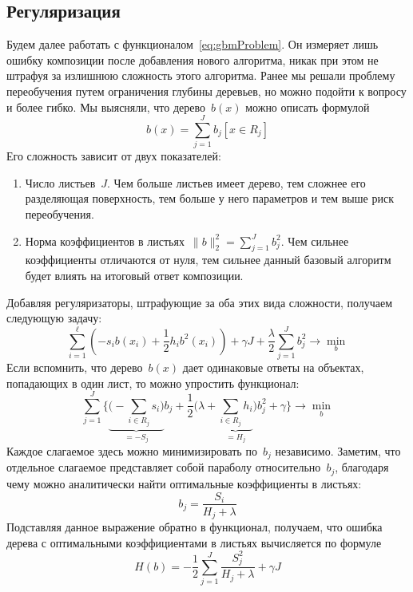 \documentclass[12pt,fleqn]{article}
\begin{document}
\subsection{Регуляризация}
Будем далее работать с функционалом~\eqref{eq:gbmProblem}.
Он измеряет лишь ошибку композиции после добавления нового алгоритма,
никак при этом не штрафуя за излишнюю сложность этого алгоритма.
Ранее мы решали проблему переобучения путем ограничения глубины деревьев,
но можно подойти к вопросу и более гибко.
Мы выясняли, что дерево~$b(x)$ можно описать формулой
\[
    b(x)
    =
    \sum_{j = 1}^{J}
        b_{j}
        [x \in R_{j}]
\]
Его сложность зависит от двух показателей:
\begin{enumerate}
    \item Число листьев~$J$. Чем больше листьев имеет дерево, тем сложнее его разделяющая поверхность,
        тем больше у него параметров и тем выше риск переобучения.
    \item Норма коэффициентов в листьях~$\|b\|_2^2 = \sum_{j = 1}^{J} b_j^2$.
        Чем сильнее коэффициенты отличаются от нуля, тем сильнее данный
        базовый алгоритм будет влиять на итоговый ответ композиции.
\end{enumerate}
Добавляя регуляризаторы, штрафующие за оба этих вида сложности, получаем следующую задачу:
\[
    \sum_{i = 1}^{\ell} \left(
        -
        s_i b(x_i)
        +
        \frac12
        h_i b^2(x_i)
    \right)
    +
    \gamma J
    +
    \frac{\lambda}{2}
    \sum_{j = 1}^{J}
        b_j^2
    \to
    \min_{b}
\]
Если вспомнить, что дерево~$b(x)$ дает одинаковые ответы на объектах,
попадающих в один лист, то можно упростить функционал:
\[
    \sum_{j = 1}^{J} \Biggl\{
        \underbrace{
        \Biggl(
            -
            \sum_{i \in R_j} s_i
        \Biggr)
        }_{=-S_j}
        b_j
        +
        \frac12
        \Biggl(
            \lambda
            +
            \underbrace{
            \sum_{i \in R_j} h_i
            }_{=H_j}
        \Biggr)
        b_j^2
        +
        \gamma
    \Biggr\}
    \to
    \min_{b}
\]
Каждое слагаемое здесь можно минимизировать по~$b_j$ независимо.
Заметим, что отдельное слагаемое представляет собой параболу относительно~$b_j$,
благодаря чему можно аналитически найти оптимальные коэффициенты в листьях:
\[
    b_j
    =
    \frac{S_i}{H_j + \lambda}
\]
Подставляя данное выражение обратно в функционал, получаем,
что ошибка дерева с оптимальными коэффициентами в листьях вычисляется по формуле
\begin{equation}
\label{eq:impurity}
    H(b)
    =
    -
    \frac12
    \sum_{j = 1}^{J}
        \frac{
            S_j^2
        }{
            H_j + \lambda
        }
    +
    \gamma J
\end{equation}
\end{document}
